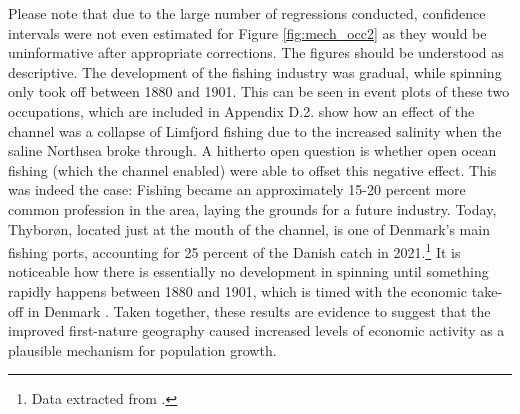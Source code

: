 \documentclass[11pt]{article}
\begin{document}
Please note that due to the large number of regressions conducted, confidence intervals were not even estimated for Figure \ref{fig:mech_occ2} as they would be uninformative after appropriate corrections. The figures should be understood as descriptive. The development of the fishing industry was gradual, while spinning only took off between 1880 and 1901. This can be seen in event plots of these two occupations, which are included in Appendix D.2. \cite{Poulsen2007} show how an effect of the channel was a collapse of Limfjord fishing due to the increased salinity when the saline Northsea broke through. A hitherto open question is whether open ocean fishing (which the channel enabled) were able to offset this negative effect. This was indeed the case: Fishing became an approximately 15-20 percent more common profession in the area, laying the grounds for a future industry. Today, Thyborøn, located just at the mouth of the channel, is one of Denmark's main fishing ports, accounting for 25 percent of the Danish catch in 2021.\footnote{Data extracted from \cite{MinisterietforFodevarer2022}.} It is noticeable how there is essentially no development in spinning until something rapidly happens between 1880 and 1901, which is timed with the economic take-off in Denmark \citep{Khaustova2015}. Taken together, these results are evidence to suggest that the improved first-nature geography caused increased levels of economic activity as a plausible mechanism for population growth. 
\end{document}
